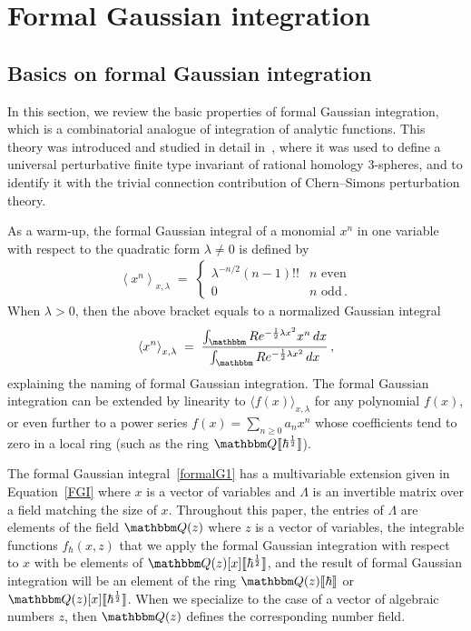\documentclass[12pt,reqno]{amsart}
\theoremstyle{definition}
\def\BQ{\mathbbm Q}
\def\BR{\mathbbm R}
\def\be{\begin{equation}}
\def\ee{\end{equation}}
\newcommand{\bea}{\begin{equation}\begin{aligned}}
\newcommand{\eea}{\end{aligned}\end{equation}}
\renewcommand{\=}{\;=\;}
\newcommand{\hroot}{\hbar^{\frac{1}{2}}}
\begin{document}

\section{Formal Gaussian integration}
\label{sec.fgi}

\subsection{Basics on formal Gaussian integration}
\label{sub.prelim}

In this section, we review the basic properties of formal Gaussian integration,
which is a combinatorial analogue of integration of analytic functions. This theory
was introduced and studied in detail in~\cite{AarhusII}, where it was used to
define a universal perturbative finite type invariant of rational homology 3-spheres,
and to identify it with the trivial connection contribution of Chern--Simons
perturbation theory. 

As a warm-up, the formal Gaussian integral of a monomial $x^n$ in one variable
with respect to the quadratic form $\lambda \neq 0$ is defined by
\bea
\label{formalG1}
\left\langle x^n \right\rangle_{x,\lambda}
\= \begin{cases}
  \lambda^{-n/2} (n-1)!! & n \,\, \text{even} \\
  0 & n \,\, \text{odd} \,.
\end{cases}
\eea
When $\lambda>0$, then the above bracket equals to a normalized Gaussian integral
\be
\left\langle x^n \right\rangle_{x,\lambda} \=
\frac{\int_\BR e^{-\frac{1}{2}\lambda x^2} x^n \, dx}{
  \int_\BR e^{-\frac{1}{2}\lambda x^2} \, dx} \,,
\ee
explaining the naming of formal Gaussian integration. The formal Gaussian integration
can be extended by linearity to $\langle f(x) \rangle_{x,\lambda}$ for any polynomial
$f(x)$, or even further to a power series $f(x) = \sum_{n \geq 0} a_n x^n$ whose
coefficients tend to zero in a local ring (such as the ring
$\BQ\llbracket \hroot \rrbracket$).

The formal Gaussian integral~\eqref{formalG1} has a multivariable extension given
in Equation~\eqref{FGI} where $x$ is a vector of variables and $\Lambda$ is
an invertible matrix over a field matching the size of $x$.
Throughout this paper, the entries of $\Lambda$ are elements of the field $\BQ(z)$
where $z$ is a vector of variables, the integrable functions $f_\hbar(x,z)$ that
we apply the formal Gaussian integration with respect to $x$ with be elements of
$\BQ(z)[x]\llbracket \hroot \rrbracket$, and the result of formal Gaussian integration
will be an element of the ring $\BQ(z)\llbracket \hbar \rrbracket$ or
$\BQ(z)[x]\llbracket \hbar^{\frac{1}{2}} \rrbracket$. When we specialize
to the case of a vector of algebraic numbers $z$, then $\BQ(z)$ defines the
corresponding number field.    
\end{document}
